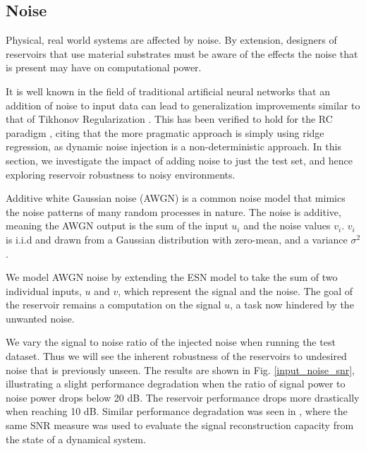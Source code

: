 \subsection{Noise}

Physical, real world systems are affected by noise. By extension, designers of
reservoirs that use material substrates must be aware of the effects the noise
that is present may have on computational power.

It is well known in the field of traditional artificial neural networks that an
addition of noise to input data can lead to generalization improvements similar
to that of Tikhonov Regularization \cite{bishop_training_1995}. This has been
verified to hold for the RC paradigm \cite{kurkova_stable_2008}, citing that the
more pragmatic approach is simply using ridge regression, as dynamic noise
injection is a non-deterministic approach. In this section, we investigate the
impact of adding noise to just the test set, and hence exploring reservoir
robustness to noisy environments.

Additive white Gaussian noise (AWGN) is a common noise model that mimics the
noise patterns of many random processes in nature. The noise is additive,
meaning the AWGN output is the sum of the input $u_{i}$ and the noise values
$v_{i}$. $v_{i}$ is i.i.d and drawn from a Gaussian distribution with zero-mean,
and a variance $\sigma^{2}$.

We model AWGN noise by extending the ESN model to take the sum of two individual
inputs, $u$ and $v$, which represent the signal and the noise. The goal of the
reservoir remains a computation on the signal $u$, a task now hindered by the
unwanted noise.

We vary the signal to noise ratio of the injected noise when running the test
dataset. Thus we will see the inherent robustness of the reservoirs to undesired
noise that is previously unseen. The results are shown in
Fig. \ref{input_noise_snr}, illustrating a slight performance degradation when
the ratio of signal power to noise power drops below 20 dB. The reservoir
performance drops more drastically when reaching 10 dB. Similar performance
degradation was seen in \cite{dambre_information_2012}, where the same SNR
measure was used to evaluate the signal reconstruction capacity from the state
of a dynamical system.

